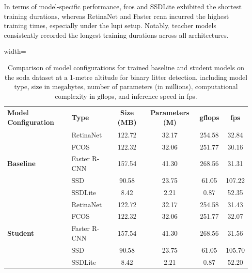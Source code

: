 In terms of model-specific performance, \gls{fcos} and SSDLite exhibited the shortest training durations, whereas RetinaNet and Faster \gls{rcnn} incurred the highest training times, especially under the \gls{lupi} setup. Notably, teacher models consistently recorded the longest training durations across all architectures.

\begin{table}[!ht]
    \centering
    \begin{adjustbox}{width=\textwidth}
    \begin{tabular}{llcccc}
        \toprule
        \textbf{Model Configuration} & \textbf{Type} & \textbf{Size (MB)} & \textbf{Parameters (M)} & \textbf{\gls{gflops}} & \textbf{\gls{fps}} \\
        \midrule
        \multirow{5}{*}{\textbf{Baseline}} 
            & RetinaNet   & 122.72 & 32.17 & 254.58 & 32.84 \\
            & FCOS        & 122.32 & 32.06 & 251.77 & 30.16 \\
            & Faster R-CNN & 157.54 & 41.30 & 268.56 & 31.31 \\
            & SSD         & 90.58  & 23.75 & 61.05 & 107.22 \\
            & SSDLite     & 8.42   & 2.21 & 0.87 & 52.35 \\
        \midrule
        \multirow{5}{*}{\textbf{Student}} 
            & RetinaNet   & 122.72 & 32.17 & 254.58 & 31.43 \\
            & FCOS        & 122.32 & 32.06 & 251.77 & 32.07 \\
            & Faster R-CNN & 157.54 & 41.30 & 268.56 & 31.56 \\
            & SSD         & 90.58  & 23.75 & 61.05 & 105.70 \\
            & SSDLite     & 8.42   & 2.21 & 0.87 & 52.20\\
        \bottomrule
    \end{tabular}
    \end{adjustbox}
    \caption{Comparison of model configurations for trained baseline and student models on the \gls{soda} dataset at a 1-metre altitude for binary litter detection, including model type, size in megabytes, number of parameters (in millions), computational complexity in \gls{gflops}, and inference speed in \gls{fps}.}
    \label{tab:model_configs_soda01m}
\end{table}

